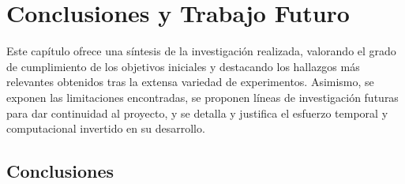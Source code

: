 \chapter{Conclusiones y Trabajo Futuro}
\label{cap:Conclusiones}

Este capítulo ofrece una síntesis de la investigación realizada, valorando el grado de cumplimiento de los objetivos iniciales y destacando los hallazgos más relevantes obtenidos tras la extensa variedad de experimentos. Asimismo, se exponen las limitaciones encontradas, se proponen líneas de investigación futuras para dar continuidad al proyecto, y se detalla y justifica el esfuerzo temporal y computacional invertido en su desarrollo.

\section{Conclusiones}
